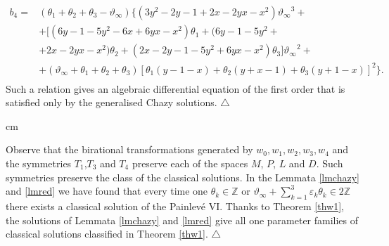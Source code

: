 \documentclass[12pt]{article}
\def\thi{{\vartheta_\infty}}
\def\eps{\varepsilon}
\newcommand {\interi}{\mathbb Z}
\theoremstyle{definition}
\theoremstyle{theorem}
\begin{document}
$$
\begin{array}{cl}
b_4=&(\theta_1+\theta_2+\theta_3-\thi)\big\{
(3y^2-2y-1+2x-2yx-x^2)\thi^3+\\ 
&+\big[(6y-1-5y^2-6x+6yx-x^2)\theta_1+
(6y-1-5y^2+\\ 
&+2x-2yx-x^2)\theta_2+(2x-2y-1-5y^2+6yx-x^2)\theta_3\big]\thi^2+\\ 
&+(\thi+\theta_1+\theta_2+\theta_3)
\left[\theta_1 (y-1-x)+\theta_2(y+x-1)+ \theta_3(y+1-x)
\right]^2\big\}.
\\ \end{array}
$$
Such a relation gives an algebraic differential equation of the first
order that is satisfied only by the generalised Chazy solutions.
{\hfill$\bigtriangleup$}

 cm

Observe that the birational transformations generated by 
$w_0,w_1,w_2,w_3,w_4$ and the symmetries $T_1$,$T_3$ and $T_4$ 
preserve each of the spaces $M$, $P$, $L$ and $D$. Such symmetries 
preserve the class of the classical solutions. In the Lemmata 
\ref{lmchazy} and \ref{lmred} we have found that every time
one $\theta_k\in\interi$ or 
$\thi+\sum_{k=1}^3\eps_k\theta_k\in 2\interi$ there exists a 
classical solution of the Painlev\'e VI. Thanks to Theorem
\ref{thw1}, the solutions of Lemmata \ref{lmchazy} and \ref{lmred} give all 
one parameter families of classical solutions classified in Theorem
\ref{thw1}.
{\hfill$\bigtriangleup$}





















\end{document}
